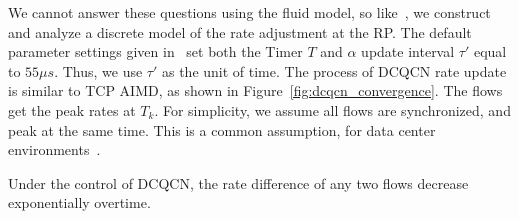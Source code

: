 We cannot answer these questions using the fluid model, so
like~\cite{dctcp-analysis}, we construct and analyze a discrete model of the
rate adjustment at the RP. The default parameter settings given in~\cite{dcqcn}
set both the Timer $T$ and $\alpha$ update interval $\tau '$ equal to $55\mu s$.
Thus, we use $\tau '$ as the unit of time.  The process of DCQCN rate update is
similar to TCP AIMD, as shown in Figure~\ref{fig:dcqcn_convergence}.  The flows
get the peak rates at $T_k$. For simplicity, we assume all flows are
synchronized, and peak at the same time.  This is a common assumption, for data
center environments~\cite{dctcp-analysis}.

\begin{thm}
Under the control of DCQCN, the rate difference of any two flows decrease exponentially
overtime. 
\end{thm}
